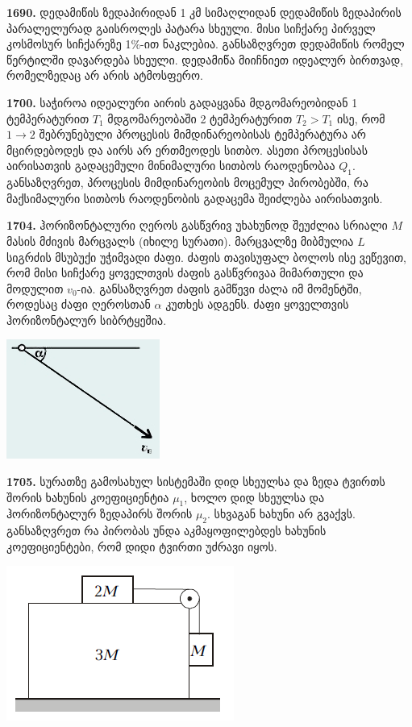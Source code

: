 \documentclass[12pt,a4paper,]{report}
\begin{document}
\textbf{1690.} დედამიწის ზედაპირიდან 1 კმ სიმაღლიდან დედამიწის ზედაპირის პარალელურად გაისროლეს პატარა სხეული. მისი სიჩქარე პირველ კოსმოსურ სიჩქარეზე 1$\%$-ით ნაკლებია. განსაზღვრეთ დედამიწის რომელ წერტილში დავარდება სხეული. დედამიწა მიიჩნიეთ იდეალურ ბირთვად, რომელზედაც არ არის ატმოსფერო. 

\textbf{1700.} საჭიროა იდეალური აირის გადაყვანა მდგომარეობიდან 1 ტემპერატურით $T_1$ მდგომარეობაში 2 ტემპერატურით $T_2>T_1$ ისე, რომ $1\rightarrow 2$ შებრუნებული პროცესის მიმდინარეობისას ტემპერატურა არ მცირდებოდეს და აირს არ ერთმეოდეს სითბო. ასეთი პროცესისას აირისათვის გადაცემული მინიმალური სითბოს რაოდენობაა $Q_1$. განსაზღვრეთ, პროცესის მიმდინარეობის მოცემულ პირობებში, რა მაქსიმალური სითბოს რაოდენობის გადაცემა შეიძლება აირისათვის.


\textbf{1704.} ჰორიზონტალური ღეროს გასწვრივ უხახუნოდ შეუძლია სრიალი $M$ მასის მძივის მარცვალს (იხილე სურათი). მარცვალზე მიბმულია $L$ სიგრძის მსუბუქი უჭიმვადი ძაფი. ძაფის თავისუფალ ბოლოს ისე ვეწევით, რომ მისი სიჩქარე ყოველთვის ძაფის გასწვრივაა მიმართული და მოდულით $v_0$-ია. განსაზღვრეთ ძაფის გამწევი ძალა იმ მომენტში, როდესაც ძაფი ღეროსთან $\alpha$ კუთხეს ადგენს.  ძაფი ყოველთვის ჰორიზონტალურ სიბრტყეშია.
		\begin{center}
			\includegraphics[scale=0.5]{images/F1704}
		\end{center}

\textbf{1705.} სურათზე გამოსახულ სისტემაში დიდ სხეულსა და ზედა ტვირთს შორის ხახუნის კოეფიციენტია $\mu_1$, ხოლო დიდ სხეულსა და ჰორიზონტალურ ზედაპირს შორის $\mu_2$. სხვაგან ხახუნი არ გვაქვს. განსაზღვრეთ რა პირობას უნდა აკმაყოფილებდეს ხახუნის კოეფიციენტები, რომ დიდი ტვირთი უძრავი იყოს.
		\begin{center}
			\includegraphics[scale=0.5]{images/F1705.png}
		\end{center}
\end{document}
